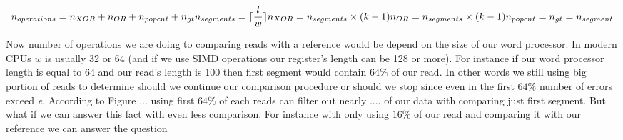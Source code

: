 \begin{equation}
\nonumber
n_{operations} = n_{XOR} + n_{OR} + n_{popcnt} + n_{gt} \\
n_{segments} =  \lceil \frac{l}{w} \rceil \\
n_{XOR} = n_{segments} \times (k-1) \\
n_{OR} = n_{segments} \times (k-1) \\
n_{popcnt} = n_{gt} = n_{segment} \\

\end{equation}  
  
Now number of operations we are doing to comparing reads with a reference would be depend on the size of our word processor. In modern CPUs $w$ is usually 32 or 64 (and if we use SIMD operations our register's length can be 128 or more). For instance if our word processor length is equal to 64 and our read's length is 100 then first segment would contain $64\%$ of our read. In other words we still using big portion of reads to determine should we continue our comparison procedure or should we stop since even in the first $64\%$ number of errors exceed \emph{e}. According to Figure ... using first $64\%$ of each reads can filter out nearly .... of our data with comparing just first segment.
But what if we can answer this fact with even less comparison. For instance with only using $16\%$ of our read and comparing it with our reference we can answer the question
  